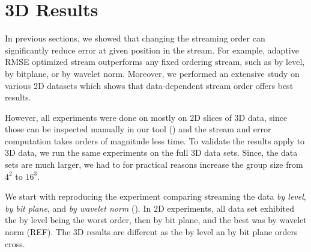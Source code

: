 \section{3D Results}
In previous sections, we showed that changing the streaming order can significantly reduce error at given position
in the stream. For example, adaptive RMSE optimized stream outperforms any fixed ordering stream, such as by level,
by bitplane, or by wavelet norm. Moreover, we performed an extensive study on various 2D datasets which shows that
data-dependent stream order offers best results.

However, all experiments were done on mostly on 2D slices of 3D data, since those can be inspected manually in our
tool () and the stream and error computation takes orders of magnitude less time. To validate the results
apply to 3D data, we run the same experiments on the full 3D data sets. Since, the data sets are much larger, we had
to for practical reasons increase the group size from $4^2$ to $16^3$.

We start with reproducing the experiment comparing streaming the data \emph{by level}, \emph{by bit plane},
and \emph{by wavelet norm} (). In 2D experiments, all data set exhibited the by level
being the worst order, then by bit plane, and the best was by wavelet norm (REF). The 3D results are different as
the by level an by bit plane orders cross. 

